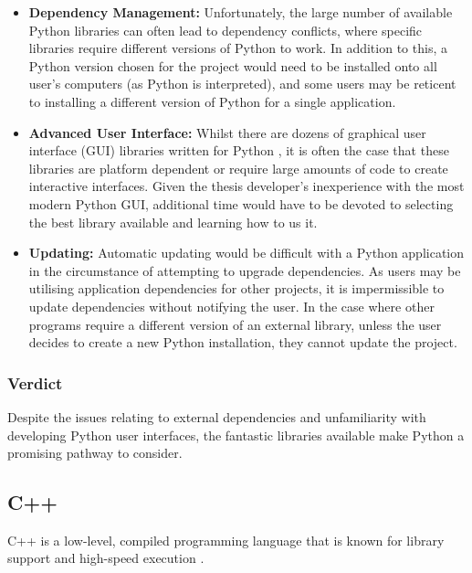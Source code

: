 \documentclass[titlesmallcaps, examinerscopy, copyrightpage]{uqthesis}
\begin{document}
\begin{itemize}
\item \textbf{Dependency Management:} Unfortunately, the large number of available Python libraries can often lead to dependency conflicts, where specific libraries require different versions of Python to work. In addition to this, a Python version chosen for the project would need to be installed onto all user's computers (as Python is interpreted), and some users may be reticent to installing a different version of Python for a single application.

\item \textbf{Advanced User Interface:} Whilst there are dozens of graphical user interface (GUI) libraries written for Python \cite{PythonGUI}, it is often the case that these libraries are platform dependent or require large amounts of code to create interactive interfaces. Given the thesis developer's inexperience with the most modern Python GUI, additional time would have to be devoted to selecting the best library available and learning how to us it.

\item \textbf{Updating:} Automatic updating would be difficult with a Python application in the circumstance of attempting to upgrade dependencies. As users may be utilising application dependencies for other projects, it is impermissible to update dependencies without notifying the user. In the case where other programs require a different version of an external library, unless the user decides to create a new Python installation, they cannot update the project.

\end{itemize}

\subsubsection{Verdict}

Despite the issues relating to external dependencies and unfamiliarity with developing Python user interfaces, the fantastic libraries available make Python a promising pathway to consider.


\subsection{C++}

C++ is a low-level, compiled programming language that is known for library support and high-speed execution \cite{cpp}.
\end{document}
